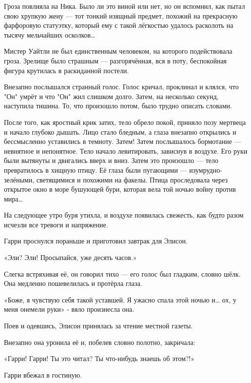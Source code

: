 \documentclass[a4paper,12pt]{book}
\begin{document}
\par
Гроза повлияла на Ника. Было ли это виной или нет, но он вспомнил, как пытал свою хрупкую жену — тот тонкий изящный предмет, похожий на прекрасную фарфоровую статуэтку, который ему с такой лёгкостью удалось расколоть на тысячу мельчайших осколков…\\
\par
Мистер Уайтли не был единственным человеком, на которого подействовала гроза. Зрелище было страшным — разгорячённая, вся в поту, беспокойная фигура крутилась в раскиданной постели.
\par
Внезапно послышался странный голос. Голос кричал, проклинал и клялся, что "Он" умрёт и что "Он" жил слишком долго. Затем, на несколько секунд, наступила тишина. То, что произошло потом, было трудно описать словами.
\par
После того, как яростный крик затих, тело обрело покой, приняло позу мертвеца и начало глубоко дышать. Лицо стало бледным, а глаза внезапно открылись и бессмысленно уставились в темноту. Затем! Затем послышалось бормотание — невнятное и непонятное. Тело начало левитировать, зависнув в воздухе. Его руки были вытянуты и двигались вверх и вниз. Затем это произошло — тело превратилось в хищную птицу. Её глаза были пугающими — изумрудно-зелёными, светящимися и похожими на факелы. Птица проследовала через открытое окно в море бушующей бури, которая вела той ночью войну против мира…\\
\par
На следующее утро буря утихла, и воздухе появилась свежесть, как будто разом исчезли все тревоги и напряжение.
\par
Гарри проснулся пораньше и приготовил завтрак для Элисон.\\
\par
«Эли? Эли! Просыпайся, уже десять часов.»
\par
Слегка встряхивая её, он говорил тихо — его голос был гладким, словно шёлк. Она медленно пошевелилась и протёрла глаза.
\par
«Боже, я чувствую себя такой уставшей. Я ужасно спала этой ночью и… ох, у меня онемели руки» - вяло произнесла она.
\par
Поев и одевшись, Элисон принялась за чтение местной газеты.
\par
Внезапно она уронила её и, побелев словно полотно, закричала:
\par
«Гарри! Гарри! Ты это читал? Ты что-нибудь знаешь об этом?!»
\par
Гарри вбежал в гостиную.
\par
\end{document}
